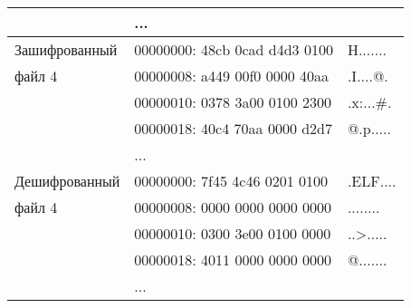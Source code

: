 \begin{table}[ht!]
\begin{center}
\begin{tabular}{|l|ll|}
                          & ... & \\
            \hline
            Зашифрованный & 00000000: 48cb 0cad d4d3 0100 & H....... \\
            файл 4        & 00000008: a449 00f0 0000 40aa & .I....@. \\
                          & 00000010: 0378 3a00 0100 2300 & .x:...\#. \\
                          & 00000018: 40c4 70aa 0000 d2d7 & @.p..... \\
                          & ... & \\
            \hline
            Дешифрованный & 00000000: 7f45 4c46 0201 0100 & .ELF.... \\
            файл 4        & 00000008: 0000 0000 0000 0000 & ........ \\
                          & 00000010: 0300 3e00 0100 0000 & ..>..... \\
                          & 00000018: 4011 0000 0000 0000 & @....... \\
                          & ... & \\
            \hline
        \end{tabular}
    \end{center}
\end{table}
